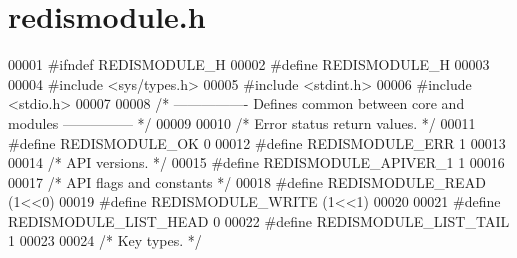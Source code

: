 \hypertarget{redismodule_8h_source}{}\section{redismodule.\+h}
\label{redismodule_8h_source}

\begin{DoxyCode}
00001 \textcolor{preprocessor}{#}\textcolor{preprocessor}{ifndef} \textcolor{preprocessor}{REDISMODULE\_H}
00002 \textcolor{preprocessor}{#}\textcolor{preprocessor}{define} \textcolor{preprocessor}{REDISMODULE\_H}
00003 
00004 \textcolor{preprocessor}{#}\textcolor{preprocessor}{include} \textcolor{preprocessor}{<}\textcolor{preprocessor}{sys}\textcolor{preprocessor}{/}\textcolor{preprocessor}{types}\textcolor{preprocessor}{.}\textcolor{preprocessor}{h}\textcolor{preprocessor}{>}
00005 \textcolor{preprocessor}{#}\textcolor{preprocessor}{include} \textcolor{preprocessor}{<}\textcolor{preprocessor}{stdint}\textcolor{preprocessor}{.}\textcolor{preprocessor}{h}\textcolor{preprocessor}{>}
00006 \textcolor{preprocessor}{#}\textcolor{preprocessor}{include} \textcolor{preprocessor}{<}\textcolor{preprocessor}{stdio}\textcolor{preprocessor}{.}\textcolor{preprocessor}{h}\textcolor{preprocessor}{>}
00007 
00008 \textcolor{comment}{/* ---------------- Defines common between core and modules --------------- */}
00009 
00010 \textcolor{comment}{/* Error status return values. */}
00011 \textcolor{preprocessor}{#}\textcolor{preprocessor}{define} \textcolor{preprocessor}{REDISMODULE\_OK} 0
00012 \textcolor{preprocessor}{#}\textcolor{preprocessor}{define} \textcolor{preprocessor}{REDISMODULE\_ERR} 1
00013 
00014 \textcolor{comment}{/* API versions. */}
00015 \textcolor{preprocessor}{#}\textcolor{preprocessor}{define} \textcolor{preprocessor}{REDISMODULE\_APIVER\_1} 1
00016 
00017 \textcolor{comment}{/* API flags and constants */}
00018 \textcolor{preprocessor}{#}\textcolor{preprocessor}{define} \textcolor{preprocessor}{REDISMODULE\_READ} \textcolor{preprocessor}{(}1\textcolor{preprocessor}{<<}0\textcolor{preprocessor}{)}
00019 \textcolor{preprocessor}{#}\textcolor{preprocessor}{define} \textcolor{preprocessor}{REDISMODULE\_WRITE} \textcolor{preprocessor}{(}1\textcolor{preprocessor}{<<}1\textcolor{preprocessor}{)}
00020 
00021 \textcolor{preprocessor}{#}\textcolor{preprocessor}{define} \textcolor{preprocessor}{REDISMODULE\_LIST\_HEAD} 0
00022 \textcolor{preprocessor}{#}\textcolor{preprocessor}{define} \textcolor{preprocessor}{REDISMODULE\_LIST\_TAIL} 1
00023 
00024 \textcolor{comment}{/* Key types. */}

\end{DoxyCode}
